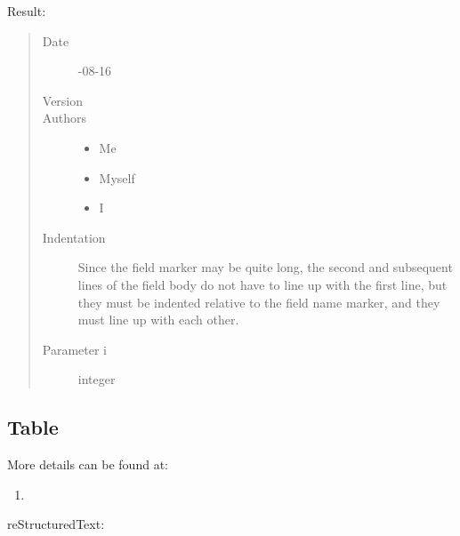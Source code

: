 \documentclass[letterpaper,11pt,english]{sphinxmanual}
\begin{document}
Result:
\begin{quote}\begin{description}
\item[{Date}] -08-16

\item[{Version}] 

\item[{Authors}] \leavevmode\begin{itemize}
\item {} 
Me

\item {} 
Myself

\item {} 
I

\end{itemize}

\item[{Indentation}] \leavevmode
Since the field marker may be quite long, the second
and subsequent lines of the field body do not have to line up
with the first line, but they must be indented relative to the
field name marker, and they must line up with each other.

\item[{Parameter i}] \leavevmode
integer

\end{description}\end{quote}


\subsection{Table}
\label{\detokenize{rtxt:table}}
More details can be found at: 
\begin{enumerate}
\def\theenumi{\arabic{enumi}}
\def\labelenumi{\theenumi .}
\makeatletter\def\p@enumii{\p@enumi \theenumi .}\makeatother
\item {} 

\end{enumerate}

reStructuredText:
\end{document}
